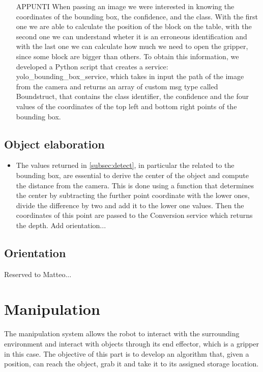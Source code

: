 \documentclass[12pt,a4paper]{article}
\begin{document}
\begin{itemize}
    \item[APPUNTI] When passing an image we were interested in knowing the coordinates of the bounding box, the confidence, and the class. With the first one we are able to calculate the position of the block on the table, with the second one we can understand wheter it is an erroneous identification and with the last one we can calculate how much we need to open the gripper, since some block are bigger than others. To obtain this information, we developed a Python script that creates a service: yolo\_bounding\_box\_service, which takes in input the path of the image from the camera and returns an array of custom msg type called Boundstruct, that contains the class identifier, the confidence and the four values of the coordinates of the top left and bottom right points of the bounding box.
\end{itemize}

\subsection{Object elaboration}\label{subsec:objel}
\begin{itemize}
    \item The values returned in \ref{subsec:detect}, in particular the related to the bounding box, are essential to derive the center of the object and compute the distance from the camera. This is done using a function that determines the center by subtracting the further point coordinate with the lower ones, divide the difference by two and add it to the lower one values. Then the coordinates of this point are passed to the Conversion service which returns the depth. Add orientation...  
\end{itemize}

\subsection{Orientation}\label{subsec:orientation}
Reserved to Matteo...

\section{Manipulation}\label{sec:manipulation}
The manipulation system allows the robot to interact with the surrounding environment and interact with objects through its end effector, which is a gripper in this case.
The objective of this part is to develop an algorithm that, given a position, can reach the object, grab it and take it to its assigned storage location.
\end{document}
